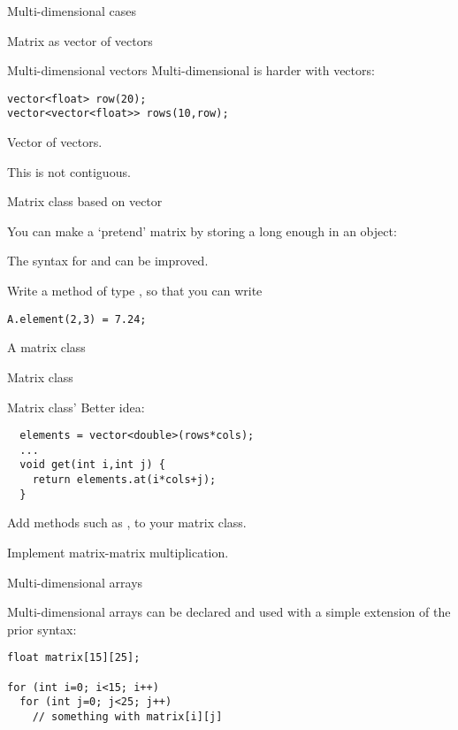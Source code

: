  {Multi-dimensional cases}

 {Matrix as vector of vectors}

\begin{block}{Multi-dimensional vectors}
  \label{sl:multi-vector}
  Multi-dimensional is harder with vectors:
\begin{verbatim}
vector<float> row(20);
vector<vector<float>> rows(10,row);
\end{verbatim}
Vector of vectors.
\end{block}

This is not contiguous.

 {Matrix class based on vector}

You can make a `pretend' matrix by storing a long enough  in
an object:
%

The syntax for  and  can be improved.
\begin{exercise}
  Write a method  of type , so that you can write
\begin{verbatim}
A.element(2,3) = 7.24;
\end{verbatim}
\end{exercise}

 {A matrix class}

\begin{block}{Matrix class}
  \label{sl:matrix-class}
\end{block}

\begin{block}{Matrix class'}
  \label{sl:matrix-class-cont}
  Better idea:
\begin{verbatim}
  elements = vector<double>(rows*cols);
  ...
  void get(int i,int j) {
    return elements.at(i*cols+j);
  }
\end{verbatim}
\end{block}


\begin{exercise}
  \label{ex:matrix-methods}
  Add methods such as ,  to your matrix class.

  Implement matrix-matrix multiplication.
\end{exercise}

 {Multi-dimensional arrays}

Multi-dimensional arrays can be declared and used with a simple extension of
the prior syntax:
\begin{verbatim}
float matrix[15][25];

for (int i=0; i<15; i++)
  for (int j=0; j<25; j++)
    // something with matrix[i][j]
\end{verbatim}

